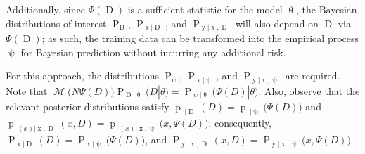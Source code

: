 \documentclass[12pt]{report}
\DeclareMathOperator{\xrm}{\mathrm{x}}
\DeclareMathOperator{\yrm}{\mathrm{y}}
\DeclareMathOperator{\Drm}{\mathrm{D}}
\DeclareMathOperator{\Prm}{\mathrm{P}}
\DeclareMathOperator{\prm}{\mathrm{p}}
\DeclareMathOperator{\Mcal}{\mathcal{M}}
\DeclareMathOperator{\upthetam}{\uptheta_\text{m}}
\DeclareMathOperator{\upthetac}{\uptheta_\text{c}}
\begin{document}
Additionally, since $\Psi(\Drm)$ is a sufficient statistic for the model $\uptheta$, the Bayesian distributions of interest $\Prm_{\Drm}$, $\Prm_{\xrm | \Drm}$, and $\Prm_{\yrm | \xrm,\Drm}$ will also depend on $\Drm$ via $\Psi(\Drm)$; as such, the training data can be transformed into the empirical process $\uppsi$ for Bayesian prediction without incurring any additional risk. 

For this approach, the distributions $\Prm_{\uppsi}$, $\Prm_{\xrm | \uppsi}$, and $\Prm_{\yrm | \xrm,\uppsi}$ are required. Note that $\Mcal\big( N \Psi(D) \big) \Prm_{\Drm | \uptheta}(D | \theta) = \Prm_{\uppsi | \uptheta}\big( \Psi(D) | \theta \big)$. Also, observe that the relevant posterior distributions satisfy $\prm_{\upthetam | \Drm}(D) = \prm_{\upthetam | \uppsi}\big( \Psi(D) \big)$ and $\prm_{\upthetac(x) | \xrm,\Drm}(x,D) = \prm_{\upthetac(x) | \xrm,\uppsi}\big( x,\Psi(D) \big)$; consequently, $\Prm_{\xrm | \Drm}(D) = \Prm_{\xrm | \uppsi}\big( \Psi(D) \big)$, and $\Prm_{\yrm | \xrm,\Drm}(x,D) = \Prm_{\yrm | \xrm,\uppsi}\big( x,\Psi(D) \big)$.
\end{document}
